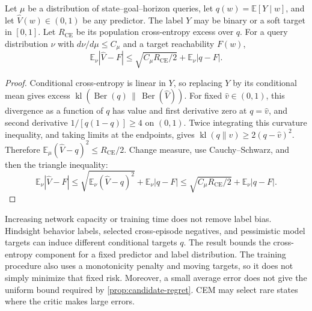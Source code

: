 \documentclass{article} %
\newcommand{\EE}{\mathbb E}
\theoremstyle{definition}
\theoremstyle{remark}
\begin{document}
\begin{proposition}
\label{prop:bce}
Let $\mu$ be a distribution of state--goal--horizon queries, let
$q(w)=\EE[Y\mid w]$, and let $\hat V(w)\in(0,1)$ be any predictor.
The label $Y$ may be binary or a soft target in $[0,1]$.
Let $R_{\mathrm{CE}}$ be its population cross-entropy excess over $q$.
For a query distribution $\nu$ with $d\nu/d\mu\le C_\mu$ and a target reachability
$F(w)$,
\begin{equation}
 \EE_\nu|\hat V-F|
 \le \sqrt{C_\mu R_{\mathrm{CE}}/2}+\EE_\nu|q-F|.
 \label{eq:bce-transfer}
\end{equation}
\end{proposition}
\begin{proof}
Conditional cross-entropy is linear in $Y$, so replacing $Y$ by its conditional
mean gives excess
$\operatorname{kl}(\operatorname{Ber}(q)\,\|\,\operatorname{Ber}(\hat V))$.
For fixed $\hat v\in(0,1)$, this divergence as a function of $q$ has value and
first derivative zero at $q=\hat v$, and second derivative
$1/[q(1-q)]\ge4$ on $(0,1)$.
Twice integrating this curvature inequality, and taking limits at the endpoints,
gives $\operatorname{kl}(q\|\hat v)\ge2(q-\hat v)^2$.
Therefore
$\EE_\mu(\hat V-q)^2\le R_{\mathrm{CE}}/2$.
Change measure, use Cauchy--Schwarz, and then the triangle inequality:
\[
 \EE_\nu|\hat V-F|
 \le\sqrt{\EE_\nu(\hat V-q)^2}+\EE_\nu|q-F|
 \le\sqrt{C_\mu R_{\mathrm{CE}}/2}+\EE_\nu|q-F|.
\]
\end{proof}
Increasing network capacity or training time does not remove label bias.
Hindsight behavior labels, selected cross-episode negatives, and pessimistic model
targets can induce different conditional targets $q$.
The result bounds the cross-entropy component for a fixed predictor and label distribution.
The training procedure also uses a monotonicity penalty and moving targets, so it does
not simply minimize that fixed risk. Moreover, a small average error does not give the
uniform bound required by \cref{prop:candidate-regret}. CEM may select rare states
where the critic makes large errors.
\end{document}
